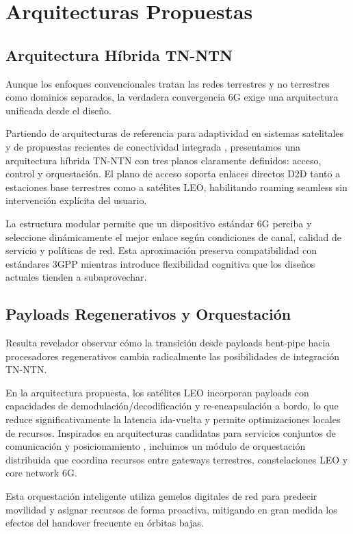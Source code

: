 \section{Arquitecturas Propuestas}

\subsection{Arquitectura Híbrida TN-NTN}

Aunque los enfoques convencionales tratan las redes terrestres y no terrestres como dominios separados, la verdadera convergencia 6G exige una arquitectura unificada desde el diseño. 

Partiendo de arquitecturas de referencia para adaptividad en sistemas satelitales \cite{Basciani2026_RA} y de propuestas recientes de conectividad integrada \cite{Ullah2026_D2D}, presentamos una arquitectura híbrida TN-NTN con tres planos claramente definidos: acceso, control y orquestación. El plano de acceso soporta enlaces directos D2D tanto a estaciones base terrestres como a satélites LEO, habilitando roaming seamless sin intervención explícita del usuario. 

La estructura modular permite que un dispositivo estándar 6G perciba y seleccione dinámicamente el mejor enlace según condiciones de canal, calidad de servicio y políticas de red. Esta aproximación preserva compatibilidad con estándares 3GPP mientras introduce flexibilidad cognitiva que los diseños actuales tienden a subaprovechar.

\subsection{Payloads Regenerativos y Orquestación}

Resulta revelador observar cómo la transición desde payloads bent-pipe hacia procesadores regenerativos cambia radicalmente las posibilidades de integración TN-NTN. 

En la arquitectura propuesta, los satélites LEO incorporan payloads con capacidades de demodulación/decodificación y re-encapsulación a bordo, lo que reduce significativamente la latencia ida-vuelta y permite optimizaciones locales de recursos. Inspirados en arquitecturas candidatas para servicios conjuntos de comunicación y posicionamiento \cite{DeGaudenzi2026_NTN}, incluimos un módulo de orquestación distribuida que coordina recursos entre gateways terrestres, constelaciones LEO y core network 6G.

Esta orquestación inteligente utiliza gemelos digitales de red para predecir movilidad y asignar recursos de forma proactiva, mitigando en gran medida los efectos del handover frecuente en órbitas bajas.

